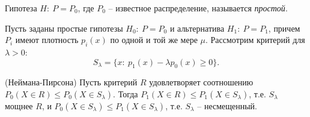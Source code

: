 \begin{definition}
    Гипотеза $\displaystyle H:\ P=P_{0}$, где $\displaystyle P_{0}$ -- известное распределение, называется \textit{простой}.
\end{definition}
Пусть заданы простые гипотезы $\displaystyle H_{0} :\ P=P_{0}$ и альтернатива $\displaystyle H_{1} :\ P=P_{1}$, причем $\displaystyle P_{i}$ имеют плотность $\displaystyle p_{i}( x)$ по одной и той же мере $\displaystyle \mu $. Рассмотрим критерий для $\lambda > 0$:
\begin{equation*}
    S_{\lambda } =\{x:\ p_{1}( x) -\lambda p_{0}( x) \geqslant 0\} .
\end{equation*}

\begin{lemma}
    (Неймана-Пирсона) Пусть критерий $\displaystyle R$ удовлетворяет соотношению $\displaystyle P_{0}( X\in R) \leqslant P_{0}( X\in S_{\lambda })$. Тогда $\displaystyle P_{1}( X\in R) \leqslant P_{1}( X\in S_{\lambda })$, т.е. $\displaystyle S_{\lambda }$ мощнее $\displaystyle R$, и $\displaystyle P_{0}( X\in S_{\lambda }) \leqslant P_{1}( X\in S_{\lambda })$, т.е. $\displaystyle S_\lambda$ -- несмещенный.
\end{lemma}
